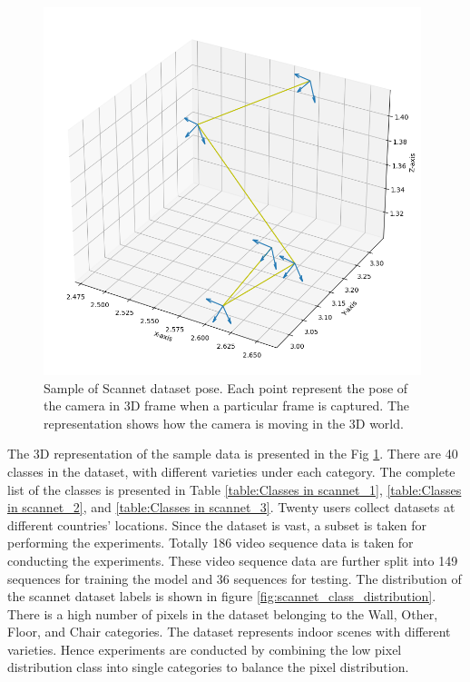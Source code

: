 	\begin{figure}
		\centering
		\includegraphics[width=11cm]{images/pose_viz_scannet.png}
		\caption{Sample of Scannet dataset pose. Each point represent the pose of the camera in 3D frame when a particular frame is captured. The representation shows how the camera is moving in the 3D world.}
		\label{fig:sample_pose_scannet}
	\end{figure}
	
	The 3D representation of the sample data is presented in the Fig \ref{fig:sample_pose_scannet}. There are 40 classes in the dataset, with different varieties under each category. The complete list of the classes is presented in Table \ref{table:Classes in scannet_1}, \ref{table:Classes in scannet_2}, and \ref{table:Classes in scannet_3}. Twenty users collect datasets at different countries' locations. Since the dataset is vast, a subset is taken for performing the experiments. Totally 186 video sequence data is taken for conducting the experiments. These video sequence data are further split into 149 sequences for training the model and 36 sequences for testing. The distribution of the scannet dataset labels is shown in figure \ref{fig:scannet_class_distribution}. There is a high number of pixels in the dataset belonging to the Wall, Other, Floor, and Chair categories. The dataset represents indoor scenes with different varieties. Hence experiments are conducted by combining the low pixel distribution class into single categories to balance the pixel distribution. 
	
